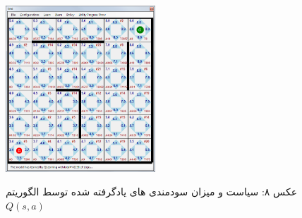 \documentclass[10pt,a4paper]{article}
\begin{document}
\begin{figure}[H]
    \centering
    \includegraphics[width=0.5\textwidth]{q}
    \begin{center}
    \textarabic{عکس ۸: سیاست و میزان سودمندی های یادگرفته شده توسط الگوریتم $Q(s, a)$ }
    \end{center}
\end{figure}
\newpage
\end{document}
